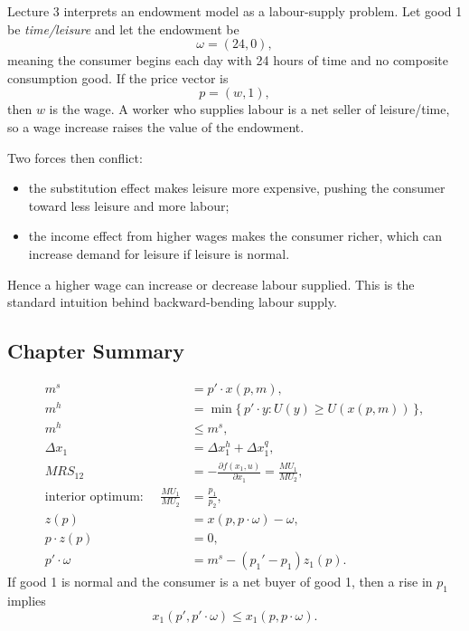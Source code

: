 \begin{policynote}[title={Policy Application: wages and labour supply}]
Lecture 3 interprets an endowment model as a labour-supply problem. Let good 1 be \emph{time/leisure} and let the endowment be
\[
\omega=(24,0),
\]
meaning the consumer begins each day with 24 hours of time and no composite consumption good. If the price vector is
\[
p=(w,1),
\]
then $w$ is the wage. A worker who supplies labour is a net seller of leisure/time, so a wage increase raises the value of the endowment.

Two forces then conflict:
\begin{itemize}
    \item the substitution effect makes leisure more expensive, pushing the consumer toward less leisure and more labour;
    \item the income effect from higher wages makes the consumer richer, which can increase demand for leisure if leisure is normal.
\end{itemize}

Hence a higher wage can increase or decrease labour supplied. This is the standard intuition behind backward-bending labour supply.
\end{policynote}

\subsection{Chapter Summary}

\begin{keyformula}[title={Key Formula: Lecture 3 Summary}]
\begin{align*}
m^s &= p' \cdot x(p,m), \\
m^h &= \min\{\, p' \cdot y : U(y)\ge U(x(p,m)) \,\}, \\
m^h &\le m^s, \\
\Delta x_1 &= \Delta x_1^h + \Delta x_1^q, \\
MRS_{12} &= -\frac{\partial f(x_1,u)}{\partial x_1}
= \frac{MU_1}{MU_2}, \\
\text{interior optimum: } \quad \frac{MU_1}{MU_2} &= \frac{p_1}{p_2}, \\
z(p) &= x(p,p\cdot \omega)-\omega, \\
p\cdot z(p) &= 0, \\
p'\cdot \omega &= m^s-(p_1'-p_1)z_1(p).
\end{align*}
If good 1 is normal and the consumer is a net buyer of good 1, then a rise in $p_1$ implies
\[
x_1(p',p'\cdot \omega)\le x_1(p,p\cdot \omega).
\]
\end{keyformula}

